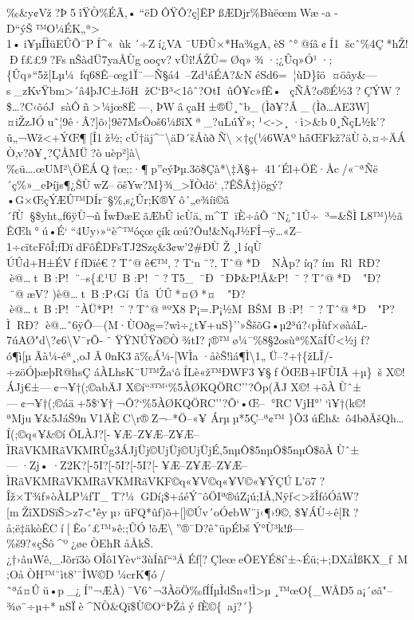 ‰\&y¢Vž?Þ5îŸÒ\%ÉÃ,•``ëDÔŸÔ?ç{]}ËPßÆDjr\%BùëœmWæ-a­D``ýŠ™O¼ÉK„ª\textgreater{}
1•i¥µÍÌüEÛÕ¯PÍ\^{}«~ùk´÷Zí¿VA¯UÐÛ×*Ha¾gA,èSˆ°@íâ¢Í1šcˆ\%4Ç*hŽ!Ðƒ££9?FsnŠàdÜ7yaÅÙgooçv?vÜî!ÁŽÛ=Øq»¾·;¿Ûq»Ó¹·;\{Ûq»``5ž{[}Lµ¼fq68Ê--œg1Ï¨---Ñ§á4--Zd¹áÉA?\&Né Sd6=¦ùD\}îö¤öãy\&---s\_zKvŸ\textquotesingle bm\textgreater´â4þJC±JöHžC`B³\textless1ôˆ?O\textquotesingle tIûÔ¥c»ƒÊ•~çÑÂ?o®É½3?ÇÝW?\$\ldots?C‹õóJ
sàÔñ\textgreater¼jœ8Ë---,ÞWâçaH±®Ü¸˜b\_(Ìð¥?Â\_(Ìð\ldots AE3W{]}¤iŽzJÓu˜¦9ê·Â?{]}õ›¦9ê7MsÔoš6¼ßîXª\_?uLúŸ»;
¹\textless-\textgreater¸·ì\textgreater\&b0\textbar¸ÑçL½k'?û„¬Wž\textless+ÝŒ­¶{[}Î1ž½;cÚ†äj\^{}¯\textbackslash äD´šÅùð­Ñ\textbackslash×†ç(¼6WAºhâŒFkž?äÙò,¤÷ÄÁ
Ò‚v?ð¥\textbar¸?ÇÅMÜ?òuèp²{]}à\textbackslash‰ü\ldots.œUM²\textbackslash ÖËÁQ†œ;:·¶p''eýÞµ.3õ\$Çà*\textbackslash‡Ä§+41´Él+ÖË·Åc/«¯ªÑë´ç\%»\_eÞíjs¶¿ŠÙwZ--öšYw?M\}¾\_\textgreater ÏÒdö`,?ÊŠÂ‡)ögý?•G×ŒçÝÆÛ™DÍr¯§\%,s¿Ûr;K®Yô´„e¾íi©â´fÙ§\$yht„ƒ6ÿÙ¬ñÎwÐæEãÆbÛicÙä‚m\^{}TïÈ÷åÕ¨N¿˜1Û÷³=\&ŠÌL8™)½ãÊŒh°ú•É```4Uy›»``è\^{}™óçœçíkœú?Ôu!\&NqJ½FÎ¬ÿ\ldots«Z--1÷cïtcFôÎ;fDïdFôÊDFsTJ2Szç\&3¢w'2\#ÐÙ
Ž¸líqÙ ÚÛd+H±ÉVffDïé€?Tˆ@ê€™‚? T`n¨?‚Tˆ@*D~NÀp? íq? ímRlRÐ?
è@\ldotst~B:P!¨--s\{£¹U~B :P!¨?T5\_¨Ð¨ÐÞ\&P!Å\&P!¨?Tˆ@*D~"Ð? ¨@æV?
)è@\ldotst~B:P‹GíÚãÚÛ*¤Ø*¤~"Ð? è@\ldotst~B:P!¨ÀÜ*P!¨?Tˆ@ªºX8
P¡=.P¡½M~BŠM~B :P!¨?Tˆ@*D~"P? Ì­RÐ?
è@\ldots ˆ6ÿÔ---(M·ÙOðg=?wì÷¿t¥+uS\}''»ŠšõG•µ2³ú?‹pÌùƒ×øàáL­7úAØ"d\textbackslash?¢6\textbackslash V¯rÕ-¨ŸŸNÚŸð©Ò¾tI?¡®™ø¼¯\%8§2osùª\%XäÍÛ\textless½j
f?ó¶ì{[}µÃà¼-éª¸,oJÃ0nK3ã‰Á¼-{[}WÌa·åèŠ!ìá¶Ì\textbackslash1„Ü--?+†\{žLÎ/­÷zöÓþæþR@hsÇ
áÀLhsK¨U™Ža`ôÍLè«ž™ÐWF3¥§ƒÖŒB+lFÙIÃ+µ\}~š X©!ÁJj€±---¢¬¥†(;©abÄJ
X©í``³™`\%5ÀØKQÖRC''?Ôp(ÃJ
X©!+õÀÙˆ±---¢¬¥†(;©áä+5\$`¥†¬Ô?{}`\%5ÀØKQÖRC''?Ô`•Œ--°RCVjH°'`ì¥†(k©!ªMju¥\&5JáŠ9nV1ÄÈC\textbackslash r®Z¬--*Ö--«¥
Árµµ*5Ç­--ª¢™
\}Õ3úÊh\&~ô4bðÂšQh\ldots Í(;©q«¥\&©íÕLÀJ?{[}-¥Æ­--Z¥Æ­--Z¥Æ­--ÌRãVKMRãVKMRÛ\textquotesingle g3ÁJjÜj©UjÜj©UjÜjÉ,5nµÔ\$5nµÔ\$5nµÔ\$õÀÙˆ±---·Zj•·Z2K?{[}-5I?{[}-5I?{[}-5I?{[}-¥Æ­--Z¥Æ­--Z¥Æ­--ÌRãVKMRãVKMRãVKMRãVKF©q«¥V©q«¥V©«¥ÝÇÚL'­ö7?Îž×T¾ƒ»òÀLP¼ƒT\_T?¼GDí¡\$+áéÝ¨ôÖIª®úZ¡ú;IÅ‚Nÿf\textless\textgreater žÎfóÓâW?{[}mŽîXDSïŠ\textgreater z7\textless"êyµ›üFQ*ûf)õ+{[}{]}©Úv´oÓ¢bW¨j‹¶›9©‚\$¥Á\textquotesingle Ù÷ê{[}R?å; ë‡äkòÊCí{[}Êo´£™»ê\textbar:;ÛÓ!õÆ\textbackslash''®¯D?ê˜üpÉbšÝ°Ù³k!ß---\%š9?«çŠô\^{}º¿øeÒEhRåÅkŠ.¿†›âuWê‚\_Jõrï3òOÎô1Yèv``3ùÍñf``³ÅÉf{[}?ÇleœeÔEYÉ8í'±\textasciitilde Éü;+;DXåÌßKX\_f~M;OåÒH™¨ìt8'¯ÎW©D¼crK¶ó/˜ªá¤Ûü•p\_¿Í''¬ÆÀ)¯V6ˆ¬3ÀöÖ‰fÍÍµÌdŠn«!Ì\textgreater µ¸™œO\{\_WÅD5a¡´øã"--¾ø¨÷µ+*nSÏè\^{}NÒ\&Qï\$Ù©O­``ÞŽåýfÈ©\{~aj?´\}
